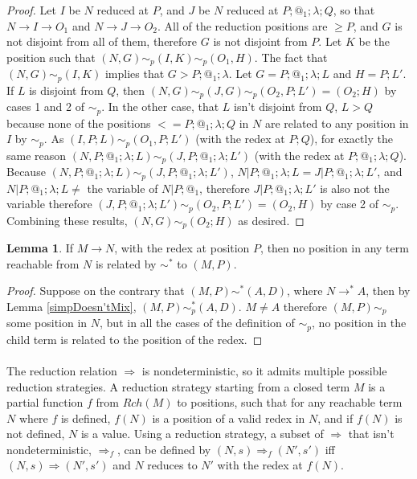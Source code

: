 \documentclass{article}
\theoremstyle{definition}
\theoremstyle{lemma}
\newtheorem{lemma}{Lemma}
\theoremstyle{remark}
\begin{document}
\begin{proof}
Let $I$ be $N$ reduced at $P$, and $J$ be $N$ reduced at $P;@_1;\lambda;Q$, so that $N \to I \to O_1$ and $N \to J \to O_2$. All of the reduction positions are $\geq P$, and $G$ is not disjoint from all of them, therefore $G$ is not disjoint from $P$. Let $K$ be the position such that $(N,G) \sim_p (I,K) \sim_p (O_1,H)$. The fact that $(N,G) \sim_p (I,K)$ implies that $G > P;@_1;\lambda$. Let $G = P;@_1;\lambda;L$ and $H = P;L'$. If $L$ is disjoint from $Q$, then $(N,G) \sim_p (J,G) \sim_p (O_2,P;L') = (O_2;H)$ by cases 1 and 2 of $\sim_p$. In the other case, that $L$ isn't disjoint from $Q$, $L > Q$ because none of the positions $<= P;@_1;\lambda;Q$ in $N$ are related to any position in $I$ by $\sim_p$. As $(I,P;L) \sim_p (O_1,P;L')$ (with the redex at $P;Q$), for exactly the same reason $(N,P;@_1;\lambda;L) \sim_p (J,P;@_1;\lambda;L')$ (with the redex at $P;@_1;\lambda;Q$). Because $(N,P;@_1;\lambda;L) \sim_p (J,P;@_1;\lambda;L')$, $N|P;@_1;\lambda;L = J|P;@_1;\lambda;L'$, and $N|P;@_1;\lambda;L \neq $ the variable of $N|P;@_1$, therefore $J|P;@_1;\lambda;L'$ is also not the variable therefore $(J,P;@_1;\lambda;L') \sim_p (O_2, P;L') = (O_2, H)$ by case 2 of $\sim_p$. Combining these results, $(N,G) \sim_p (O_2;H)$ as desired.

\end{proof}

\begin{lemma} \label{redexDestroyed}
If $M \to N$, with the redex at position $P$, then no position in any term reachable from $N$ is related by $\sim^*$ to $(M,P)$.
\end{lemma}
\begin{proof}
Suppose on the contrary that $(M,P) \sim^* (A,D)$, where $N \to^* A$, then by Lemma \ref{simpDoesn'tMix}, $(M,P) \sim_p^* (A,D)$. $M \neq A$ therefore $(M,P) \sim_p$ some position in $N$, but in all the cases of the definition of $\sim_p$, no position in the child term is related to the position of the redex.
\end{proof}

\paragraph{}
The reduction relation $\Rightarrow$ is nondeterministic, so it admits multiple possible reduction strategies. A reduction strategy starting from a closed term $M$ is a partial function $f$ from $Rch(M)$ to positions, such that for any reachable term $N$ where $f$ is defined, $f(N)$ is a position of a valid redex in $N$, and if $f(N)$ is not defined, $N$ is a value. Using a reduction strategy, a subset of $\Rightarrow$ that isn't nondeterministic, $\Rightarrow_f$, can be defined by $(N,s) \Rightarrow_f (N',s')$ iff $(N,s) \Rightarrow (N',s')$ and $N$ reduces to $N'$ with the redex at $f(N)$.
\end{document}
